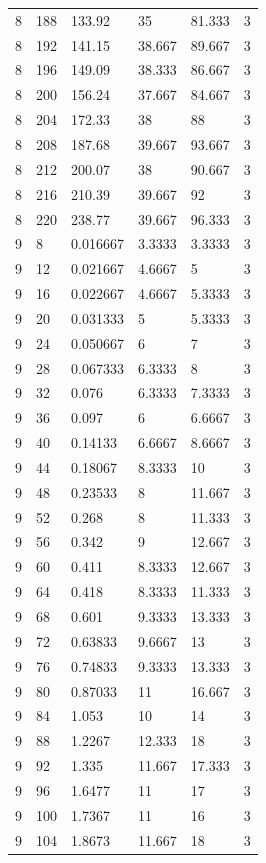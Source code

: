 \begin{tabular}{|p{0.6cm}|p{0.5cm}|p{1.15cm}|p{1cm}|p{1cm}|p{0.7cm}|}
8 & 188 & 133.92 & 35 & 81.333 & 3 \\
8 & 192 & 141.15 & 38.667 & 89.667 & 3 \\
8 & 196 & 149.09 & 38.333 & 86.667 & 3 \\
8 & 200 & 156.24 & 37.667 & 84.667 & 3 \\
8 & 204 & 172.33 & 38 & 88 & 3 \\
8 & 208 & 187.68 & 39.667 & 93.667 & 3 \\
8 & 212 & 200.07 & 38 & 90.667 & 3 \\
8 & 216 & 210.39 & 39.667 & 92 & 3 \\
8 & 220 & 238.77 & 39.667 & 96.333 & 3 \\
9 & 8 & 0.016667 & 3.3333 & 3.3333 & 3 \\
9 & 12 & 0.021667 & 4.6667 & 5 & 3 \\
9 & 16 & 0.022667 & 4.6667 & 5.3333 & 3 \\
9 & 20 & 0.031333 & 5 & 5.3333 & 3 \\
9 & 24 & 0.050667 & 6 & 7 & 3 \\
9 & 28 & 0.067333 & 6.3333 & 8 & 3 \\
9 & 32 & 0.076 & 6.3333 & 7.3333 & 3 \\
9 & 36 & 0.097 & 6 & 6.6667 & 3 \\
9 & 40 & 0.14133 & 6.6667 & 8.6667 & 3 \\
9 & 44 & 0.18067 & 8.3333 & 10 & 3 \\
9 & 48 & 0.23533 & 8 & 11.667 & 3 \\
9 & 52 & 0.268 & 8 & 11.333 & 3 \\
9 & 56 & 0.342 & 9 & 12.667 & 3 \\
9 & 60 & 0.411 & 8.3333 & 12.667 & 3 \\
9 & 64 & 0.418 & 8.3333 & 11.333 & 3 \\
9 & 68 & 0.601 & 9.3333 & 13.333 & 3 \\
9 & 72 & 0.63833 & 9.6667 & 13 & 3 \\
9 & 76 & 0.74833 & 9.3333 & 13.333 & 3 \\
9 & 80 & 0.87033 & 11 & 16.667 & 3 \\
9 & 84 & 1.053 & 10 & 14 & 3 \\
9 & 88 & 1.2267 & 12.333 & 18 & 3 \\
9 & 92 & 1.335 & 11.667 & 17.333 & 3 \\
9 & 96 & 1.6477 & 11 & 17 & 3 \\
9 & 100 & 1.7367 & 11 & 16 & 3 \\
9 & 104 & 1.8673 & 11.667 & 18 & 3 \\

\end{tabular}
